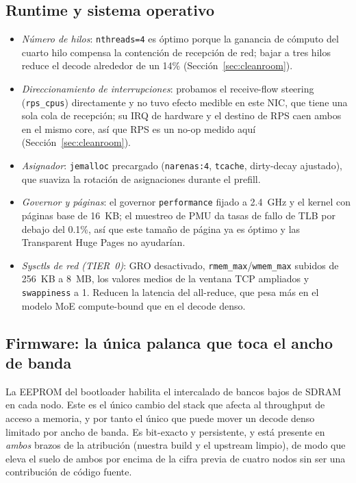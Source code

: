 \documentclass[10pt,a4paper]{article}
\begin{document}
\subsection{Runtime y sistema operativo}
\begin{itemize}
  \item \emph{Número de hilos}: \texttt{nthreads=4} es óptimo porque la ganancia de cómputo del cuarto hilo compensa la contención de recepción de red; bajar a tres hilos reduce el decode alrededor de un 14\% (Sección~\ref{sec:cleanroom}).
  \item \emph{Direccionamiento de interrupciones}: probamos el receive-flow steering (\texttt{rps\_cpus}) directamente y no tuvo efecto medible en este NIC, que tiene una sola cola de recepción; su IRQ de hardware y el destino de RPS caen ambos en el mismo core, así que RPS es un no-op medido aquí (Sección~\ref{sec:cleanroom}).
  \item \emph{Asignador}: \texttt{jemalloc} precargado (\texttt{narenas:4}, \texttt{tcache}, dirty-decay ajustado), que suaviza la rotación de asignaciones durante el prefill.
  \item \emph{Governor y páginas}: el governor \texttt{performance} fijado a 2.4~GHz y el kernel con páginas base de 16~KB; el muestreo de PMU da tasas de fallo de TLB por debajo del 0.1\%, así que este tamaño de página ya es óptimo y las Transparent Huge Pages no ayudarían.
  \item \emph{Sysctls de red (TIER~0)}: GRO desactivado, \texttt{rmem\_max}/\texttt{wmem\_max} subidos de 256~KB a 8~MB, los valores medios de la ventana TCP ampliados y \texttt{swappiness} a 1. Reducen la latencia del all-reduce, que pesa más en el modelo MoE compute-bound que en el decode denso.
\end{itemize}

\subsection{Firmware: la única palanca que toca el ancho de banda}
La EEPROM del bootloader habilita el intercalado de bancos bajos de SDRAM en cada nodo. Este es el único cambio del stack que afecta al throughput de acceso a memoria, y por tanto el único que puede mover un decode denso limitado por ancho de banda. Es bit-exacto y persistente, y está presente en \emph{ambos} brazos de la atribución (nuestra build y el upstream limpio), de modo que eleva el suelo de ambos por encima de la cifra previa de cuatro nodos sin ser una contribución de código fuente.
\end{document}
